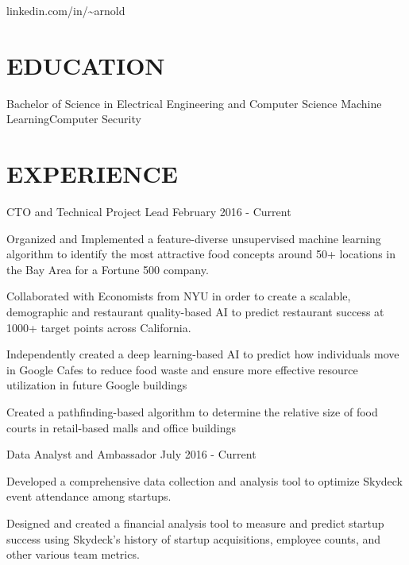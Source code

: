 \documentclass[10pt]{article}
\begin{document}
				 {linkedin.com/in/{\textasciitilde}arnold}      

\section*{EDUCATION}

			{Bachelor of Science in Electrical Engineering and Computer Science}
			{Machine Learning}{Computer Security}


\section*{EXPERIENCE}

								{CTO and Technical Project Lead}
								{February 2016 - Current}                  		
	                   \begin{accomplishments} 
	                    		\item Organized and Implemented a feature-diverse unsupervised machine learning algorithm to identify the most attractive food concepts around 50+ locations in the Bay Area for a Fortune 500 company.
	                    		\item Collaborated with Economists from NYU in order to create a scalable, demographic and restaurant quality-based AI to predict restaurant success at 1000+ target points across California.
	                    		\item Independently created a deep learning-based AI to predict how individuals move in Google Cafes to reduce food waste and ensure more effective resource utilization in future Google buildings
	                    		\item Created a pathfinding-based algorithm to determine the relative size of food courts in retail-based malls and office buildings
	                    \end{accomplishments}
	                    		
	   		
	   			{Data Analyst and Ambassador}
	   			{July 2016 - Current}
			  		\begin{accomplishments}
	                   		\item Developed a comprehensive data collection and analysis tool to optimize Skydeck event attendance among startups.
	                   		\item Designed and created a financial analysis tool to measure and predict startup success using Skydeck's history of startup acquisitions, employee counts, and other various team metrics.
	                  \end{accomplishments}
                  	 
\end{document}
